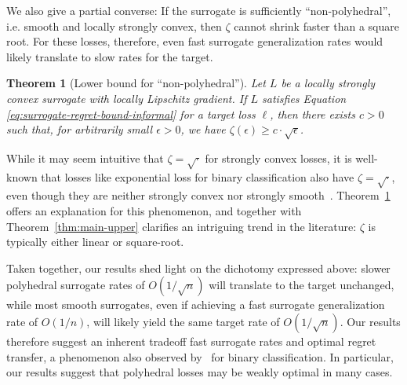 \documentclass{article}
\newtheorem{theorem}{Theorem}
\theoremstyle{definition}\newtheorem{definition}{Definition}
\theoremstyle{definition}\newtheorem{assumption}{Assumption}
\newcommand{\Comments}{1}
\newcommand{\mynote}[2]{\ifnum\Comments=1\textcolor{#1}{#2}\fi}
\newcommand{\bo}[1]{\mynote{blue}{[Bo: #1]}}
\begin{document}
We also give a partial converse: If the surrogate is sufficiently ``non-polyhedral'', i.e. smooth and locally strongly convex, then $\zeta$ cannot shrink faster than a square root.
For these losses, therefore, even fast surrogate generalization rates would likely translate to slow rates for the target.
\begin{theorem}[Lower bound for ``non-polyhedral'']
  \label{thm:main-lower}
  Let $L$ be a locally strongly convex surrogate with locally Lipschitz gradient.
  If $L$ satisfies Equation \ref{eq:surrogate-regret-bound-informal} for a target loss $\ell$, then there exists $c>0$ such that, for arbitrarily small $\epsilon>0$, we have $\zeta(\epsilon) \geq c\cdot\sqrt{\epsilon}$.
\end{theorem}
While it may seem intuitive that $\zeta=\sqrt{\cdot}$ for strongly convex losses, it is well-known that losses like exponential loss for binary classification also have $\zeta=\sqrt{\cdot}$, even though they are neither strongly convex nor strongly smooth~\cite{bartlett2006convexity}.
Theorem~\ref{thm:main-lower} offers an explanation for this phenomenon, and together with Theorem~\ref{thm:main-upper} clarifies an intriguing trend in the literature: $\zeta$ is typically either linear or square-root.

Taken together, our results shed light on the dichotomy expressed above: slower polyhedral surrogate rates of $O(1/\sqrt{n})$ will translate to the target unchanged, while most smooth surrogates, even if achieving a fast surrogate generalization rate of $O(1/n)$, will likely yield the same target rate of $O(1/\sqrt{n})$.
Our results therefore suggest an inherent tradeoff fast surrogate rates and optimal regret transfer, a phenomenon also observed by~\citet{mahdavi2014binary} for binary classification.
In particular, our results suggest that polyhedral losses may be weakly optimal in many cases.
\end{document}
